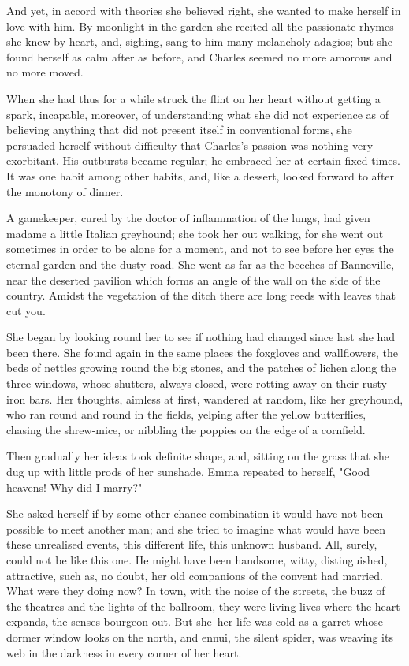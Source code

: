 \documentclass[11pt,twocolumn]{ltugboat}
\begin{document}
And yet, in accord with theories she believed right, she wanted to make
herself in love with him. By moonlight in the garden she recited all
the passionate rhymes she knew by heart, and, sighing, sang to him many
melancholy adagios; but she found herself as calm after as before, and
Charles seemed no more amorous and no more moved.

When she had thus for a while struck the flint on her heart without
getting a spark, incapable, moreover, of understanding what she did
not experience as of believing anything that did not present itself
in conventional forms, she persuaded herself without difficulty that
Charles's passion was nothing very exorbitant. His outbursts became
regular; he embraced her at certain fixed times. It was one habit among
other habits, and, like a dessert, looked forward to after the monotony
of dinner.

A gamekeeper, cured by the doctor of inflammation of the lungs, had
given madame a little Italian greyhound; she took her out walking, for
she went out sometimes in order to be alone for a moment, and not to see
before her eyes the eternal garden and the dusty road. She went as far
as the beeches of Banneville, near the deserted pavilion which forms an
angle of the wall on the side of the country. Amidst the vegetation of
the ditch there are long reeds with leaves that cut you.

She began by looking round her to see if nothing had changed since last
she had been there. She found again in the same places the foxgloves and
wallflowers, the beds of nettles growing round the big stones, and
the patches of lichen along the three windows, whose shutters, always
closed, were rotting away on their rusty iron bars. Her thoughts,
aimless at first, wandered at random, like her greyhound, who ran round
and round in the fields, yelping after the yellow butterflies, chasing
the shrew-mice, or nibbling the poppies on the edge of a cornfield.

Then gradually her ideas took definite shape, and, sitting on the grass
that she dug up with little prods of her sunshade, Emma repeated to
herself, "Good heavens! Why did I marry?"

She asked herself if by some other chance combination it would have not
been possible to meet another man; and she tried to imagine what would
have been these unrealised events, this different life, this unknown
husband. All, surely, could not be like this one. He might have been
handsome, witty, distinguished, attractive, such as, no doubt, her old
companions of the convent had married. What were they doing now? In
town, with the noise of the streets, the buzz of the theatres and the
lights of the ballroom, they were living lives where the heart expands,
the senses bourgeon out. But she--her life was cold as a garret whose
dormer window looks on the north, and ennui, the silent spider, was
weaving its web in the darkness in every corner of her heart.
\end{document}
